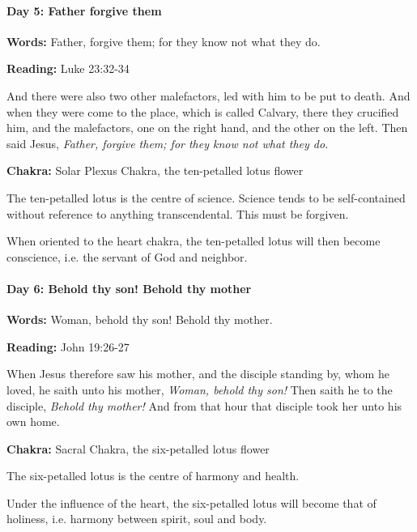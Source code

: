 \paragraph{Day 5: Father forgive them}

\textbf{Words:} Father, forgive them; for they know not what they do.

\textbf{Reading:} Luke 23:32-34


\begin{quotex}
And there were also two other malefactors, led with him to be put to death. And when they were come to the place, which is called Calvary, there they crucified him, and the malefactors, one on the right hand, and the other on the left. Then said Jesus, \textit{Father, forgive them; for they know not what they do.}

\end{quotex}

\textbf{Chakra:} Solar Plexus Chakra, the ten-petalled lotus flower

The ten-petalled lotus is the centre of science. Science tends to be self-contained without reference to anything transcendental. This must be forgiven.

When oriented to the heart chakra, the ten-petalled lotus will then become conscience, i.e. the servant of God and neighbor.


\paragraph{Day 6: Behold thy son! Behold thy mother}

\textbf{Words:} Woman, behold thy son! Behold thy mother.

\textbf{Reading:} John 19:26-27


\begin{quotex}
When Jesus therefore saw his mother, and the disciple standing by, whom he loved, he saith unto his mother, \textit{Woman, behold thy son!} Then saith he to the disciple, \textit{Behold thy mother!} And from that hour that disciple took her unto his own home.

\end{quotex}
\textbf{Chakra:} Sacral Chakra, the six-petalled lotus flower

The six-petalled lotus is the centre of harmony and health.

Under the influence of the heart, the six-petalled lotus will become that of holiness, i.e. harmony between spirit, soul and body.



